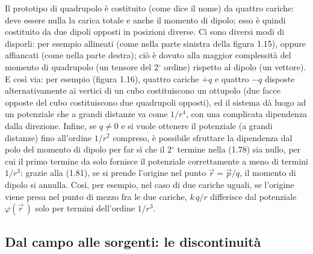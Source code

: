 Il prototipo di quadrupolo è costituito (come dice il nome) da quattro cariche: deve essere nulla la carica totale e anche il momento di dipolo; esso è quindi costituito da due dipoli opposti in posizioni diverse. Ci sono diversi modi di disporli: per esempio allineati (come nella parte sinistra della figura 1.15), oppure affiancati (come nella parte destra); ciò è dovuto alla maggior complessità del momento di quadrupolo (un tensore del 2$^\circ$ ordine) rispetto al dipolo (un vettore).
E così via: per esempio (figura 1.16), quattro cariche $+q$ e quattro $-q$ disposte alternativamente ai vertici di un cubo costituiscono un ottupolo (due facce opposte del cubo costituiscono due quadrupoli opposti), ed il sistema dà luogo ad un potenziale che a grandi distanze va come $1/r^4$, con una complicata dipendenza dalla direzione.
Infine, se $q\neq0$ e si vuole ottenere il potenziale (a grandi distanze) fino all'ordine $1/r^2$ compreso, è possibile sfruttare la dipendenza dal polo del momento di dipolo per far sì che il 2$^\circ$ termine nella (1.78) sia nullo, per cui il primo termine da solo fornisce il potenziale correttamente a meno di termini $1/r^3$: grazie alla (1.81), se si prende l'origine nel punto $\vec r=\vec p/q$, il momento di dipolo si annulla. Così, per esempio, nel caso di due cariche uguali, se l'origine viene presa nel punto di mezzo fra le due cariche, $k\,q/r$ differisce dal potenziale $\varphi(\vec r\,)$ solo per termini dell'ordine $1/r^3$.

\subsection{Dal campo alle sorgenti: le discontinuità}


